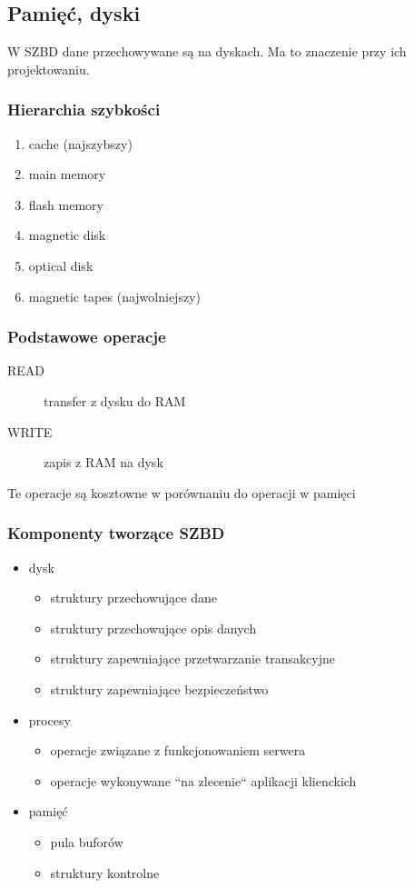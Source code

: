 \documentclass[12pt]{article}
\begin{document}
\subsection{Pamięć, dyski}
W \ac{SZBD} dane przechowywane są na dyskach. Ma to znaczenie przy ich projektowaniu.

\subsubsection{Hierarchia szybkości}
\begin{enumerate}
\item cache (najszybszy)
\item main memory
\item flash memory
\item magnetic disk
\item optical disk
\item magnetic tapes (najwolniejszy)
\end{enumerate}

\subsubsection{Podstawowe operacje}
\begin{description}
\item[READ] transfer z dysku do RAM
\item[WRITE] zapis z RAM na dysk
\end{description}
Te operacje są kosztowne w porównaniu do operacji w pamięci

\subsubsection{Komponenty tworzące \ac{SZBD}}
\begin{itemize}
\item dysk
\begin{itemize}
\item struktury przechowujące dane
\item struktury przechowujące opis danych
\item struktury zapewniające przetwarzanie transakcyjne
\item struktury zapewniające bezpieczeństwo
\end{itemize}
\item procesy
\begin{itemize}
\item operacje związane z funkcjonowaniem serwera
\item operacje wykonywane ``na zlecenie`` aplikacji klienckich
\end{itemize}
\item pamięć
\begin{itemize}
\item pula buforów
\item struktury kontrolne
\end{itemize}
\end{itemize}
\end{document}
